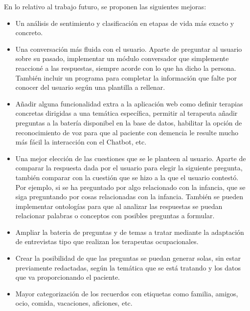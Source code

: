 En lo relativo al trabajo futuro, se proponen las siguientes mejoras:
\begin{itemize}
	\item Un análisis de sentimiento y clasificación en etapas de vida más exacto y concreto.
	\item Una conversación más fluida con el usuario. Aparte de preguntar al usuario sobre su pasado, implementar un módulo conversador que simplemente reaccioné a las respuestas, siempre acorde con lo que ha dicho la persona. También incluir un programa para completar la información que falte por conocer del usuario según una plantilla a rellenar.
	\item Añadir alguna funcionalidad extra a la aplicación web como definir terapias concretas dirigidas a una temática específica, permitir al terapeuta añadir preguntas a la batería disponibel en la base de datos, habilitar la opción de reconocimiento de voz para que al paciente con demencia le resulte mucho más fácil la interacción con el Chatbot, etc.
	\item Una mejor elección de las cuestiones que se le planteen al usuario. Aparte de comparar la respuesta dada por el usuario para elegir la siguiente pregunta, también comparar con la cuestión que se hizo a la que el usuario contestó. Por ejemplo, si se ha preguntado por algo relacionado con la infancia, que se siga preguntando por cosas relacionadas con la infancia. También se pueden implementar ontologías para que al analizar las respuestas se puedan relacionar palabras o conceptos con posibles preguntas a formular.
	\item Ampliar la bateria de preguntas y de temas a tratar mediante la adaptación de entrevistas tipo que realizan los terapeutas ocupacionales.
	\item Crear la posibilidad de que las preguntas se puedan generar solas, sin estar previamente redactadas, según la temática que se está tratando y los datos que va proporcionando el paciente. 
	\item Mayor categorización de los recuerdos con etiquetas como familia, amigos, ocio, comida, vacaciones, aficiones, etc.
\end{itemize}